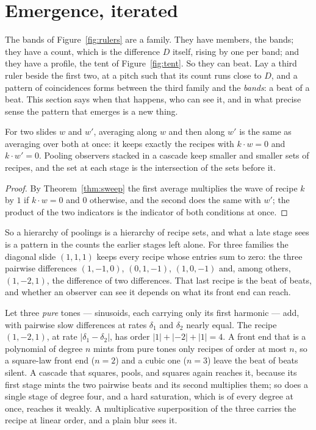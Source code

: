\section{Emergence, iterated}
\label{sec:iterated}

The bands of Figure~\ref{fig:rulers} are a family. They have members, the
bands; they have a count, which is the difference $D$ itself, rising by one
per band; and they have a profile, the tent of Figure~\ref{fig:tent}. So
they can beat. Lay a third ruler beside the first two, at a pitch such that
its count runs close to $D$, and a pattern of coincidences forms between
the third family and the \emph{bands}: a beat of a beat. This section says
when that happens, who can see it, and in what precise sense the pattern
that emerges is a new thing.

\begin{proposition}
\label{prop:tower}
For two slides $w$ and $w'$, averaging along $w$ and then along $w'$ is the
same as averaging over both at once: it keeps exactly the recipes with
$k\cdot w=0$ and $k\cdot w'=0$. Pooling observers stacked in a cascade keep
smaller and smaller sets of recipes, and the set at each stage is the
intersection of the sets before it.
\end{proposition}

\begin{proof}
By Theorem~\ref{thm:sweep} the first average multiplies the wave of
recipe $k$ by $1$ if $k\cdot w=0$ and $0$ otherwise, and the second does the
same with $w'$; the product of the two indicators is the indicator of both
conditions at once.
\end{proof}

So a hierarchy of poolings is a hierarchy of recipe sets, and what a late
stage sees is a pattern in the counts the earlier stages left alone. For
three families the diagonal slide $(1,1,1)$ keeps every recipe whose
entries sum to zero: the three pairwise differences $(1,-1,0)$, $(0,1,-1)$,
$(1,0,-1)$ and, among others, $(1,-2,1)$, the difference of two differences.
That last recipe is the beat of beats, and whether an observer can see it
depends on what its front end can reach.

\begin{theorem}
\label{thm:cascade}
Let three \emph{pure} tones --- sinusoids, each carrying only its first
harmonic --- add, with pairwise slow differences at rates $\delta_1$ and
$\delta_2$ nearly equal. The recipe $(1,-2,1)$, at rate $|\delta_1-\delta_2|$,
has order $|1|+|{-2}|+|1|=4$. A front end that is a polynomial of degree
$n$ mints from pure tones only recipes of order at most $n$, so a
square-law front end ($n=2$) and a cubic one ($n=3$) leave the beat of
beats silent. A cascade that squares, pools, and squares again reaches it,
because its first stage mints the two pairwise beats and its second
multiplies them; so does a single stage of degree four, and a hard
saturation, which is of every degree at once, reaches it weakly. A
multiplicative superposition of the three carries the recipe at linear
order, and a plain blur sees it.
\end{theorem}

